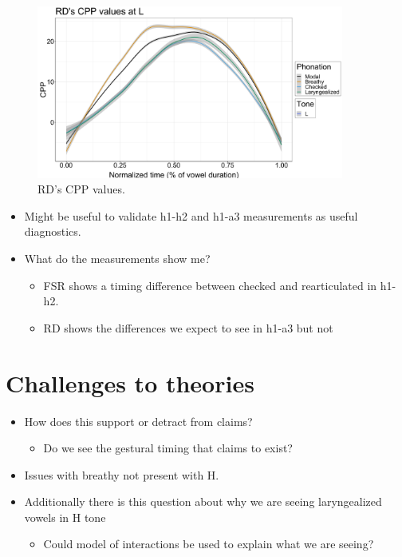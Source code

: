 \documentclass[12pt, letterpaper]{article}
\begin{document}
	
\begin{figure}[!ht]
	\includegraphics[width=0.9\textwidth]{../RDCPP_lineL.png}
	\caption{RD's CPP values.}
	\label{fig:RDCPP} 
\end{figure}	

\begin{itemize}
	\item Might be useful to validate h1-h2 and h1-a3 measurements as useful diagnostics. 
	\item What do the measurements show me?
	\begin{itemize}
		\item FSR shows a timing difference between checked and rearticulated in h1-h2.
		\item RD shows the differences we expect to see in h1-a3 but not 
	\end{itemize}
\end{itemize}

\section{Challenges to theories} \label{sec:Challenges}

\begin{itemize}
	\item How does this support or detract from  claims?
	\begin{itemize}
		\item Do we see the gestural timing that \citet{silvermanLaryngealComplexityOtomanguean1997} claims to exist?
	\end{itemize}
	\item Issues with breathy not present with H. 
	\item Additionally there is this question about why we are seeing laryngealized vowels in H tone
	\begin{itemize}
		\item Could  model of interactions be used to explain what we are seeing?
	\end{itemize}
\end{itemize}
\end{document}
